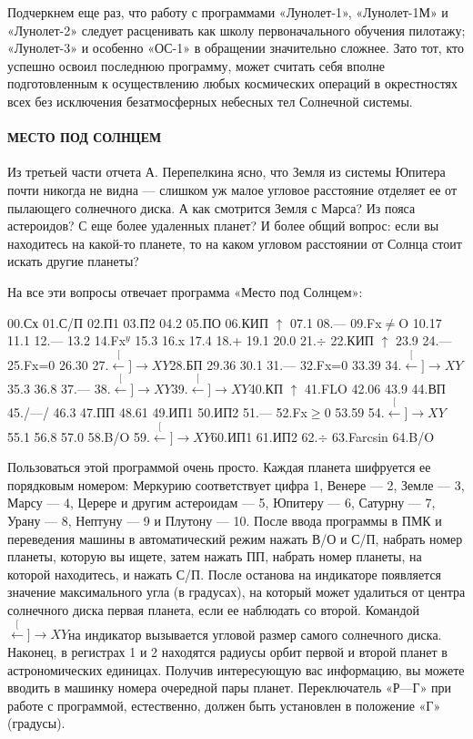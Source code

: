 \documentclass[11pt,a4paper,oneside]{article}
\def\XY{$\stackrel[\leftarrow]{\rightarrow}{XY}$}
\begin{document}
Подчеркнем еще раз, что работу с программами «Лунолет-1», «Лунолет-1М» и «Лунолет-2» следует расценивать как школу первоначального обучения пилотажу; «Лунолет-3» и особенно «ОС-1» в обращении значительно сложнее. Зато тот, кто успешно освоил последнюю программу, может считать себя вполне подготовленным к осуществлению любых космических операций в окрестностях всех без исключения безатмосферных небесных тел Солнечной системы.

\paragraph{МЕСТО ПОД СОЛНЦЕМ}
Из третьей части отчета А. Перепелкина ясно, что Земля из системы Юпитера почти никогда не видна — слишком уж малое угловое расстояние отделяет ее от пылающего солнечного диска. А как смотрится Земля с Марса? Из пояса астероидов? С еще более удаленных планет? И более общий вопрос: если вы находитесь на какой-то планете, то на каком угловом расстоянии от Солнца стоит искать другие планеты?

На все эти вопросы отвечает программа «Место под Солнцем»:

00.Сх 01.С/П 02.П1 03.П2 04.2 05.ПО 06.КИП $\uparrow$ 07.1 08.— 09.Fx$\neq$O 10.17 11.1 12.— 13.2 14.Fx$^{y}$ 15.3 16.x 17.4 18.+ 19.1 20.0 21.$\div$ 22.КИП $\uparrow$ 23.9 24.— 25.Fx=0 26.30 27.\XY 28.БП 29.36 30.1 31.— 32.Fx=0 33.39 34.\XY 35.3 36.8 37.— 38.\XY 39.\XY 40.КП $\uparrow$ 41.FLO 42.06 43.9 44.ВП 45./—/ 46.3 47.ПП 48.61
49.ИП1 50.ИП2 51.— 52.Fx$\geq$0 53.59
54.\XY 55.1 56.8 57.0 58.B/O 59.\XY 60.ИП1 61.ИП2 62.$\div$ 63.Farcsin 64.B/O

Пользоваться этой программой очень просто. Каждая планета шифруется ее порядковым номером: Меркурию соответствует цифра 1, Венере — 2, Земле — 3, Марсу — 4, Церере и другим астероидам — 5, Юпитеру — 6, Сатурну — 7, Урану — 8, Нептуну — 9 и Плутону — 10. После ввода программы в ПМК и переведения машины в автоматический режим нажать В/О и С/П, набрать номер планеты, которую вы ищете, затем нажать ПП, набрать номер планеты, на которой находитесь, и нажать С/П. После останова на индикаторе появляется значение максимального угла (в градусах), на который может удалиться от центра солнечного диска первая планета, если ее наблюдать со второй. Командой \XY на индикатор вызывается угловой размер самого солнечного диска. Наконец, в регистрах 1 и 2 находятся радиусы орбит первой и второй планет в астрономических единицах. Получив интересующую вас информацию, вы можете вводить в машинку номера очередной пары планет. Переключатель «Р—Г» при работе с программой, естественно, должен быть установлен в положение «Г» (градусы).
\end{document}

